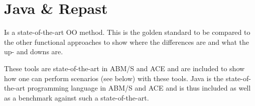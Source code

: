 
\chapter{Java \& Repast} 
Is a state-of-the-art OO method. This is the golden standard to be compared to the other functional approaches to show where the differences are and what the up- and downs are.

These tools are state-of-the-art in ABM/S and ACE and are included to show how one can perform scenarios (see below) with these tools.
Java is the state-of-the-art programming language in ABM/S and ACE and is thus included as well as a benchmark against such a state-of-the-art.
